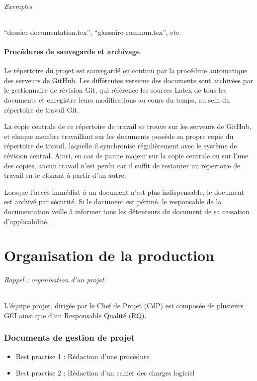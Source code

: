 \documentclass[a4paper]{article}
\begin{document}
\paragraph{Exemples} ``dossier-documentation.tex'', ``glossaire-commun.tex'', etc.

\subsection{Procédures de sauvegarde et archivage}

Le répertoire du projet est sauvegardé en continu par la procédure automatique des serveurs de GitHub. Les différentes versions des documents sont archivées par le gestionnaire de révision Git, qui référence les sources Latex de tous les documents et enregistre leurs modifications au cours du temps, au sein du répertoire de travail Git.

La copie centrale de ce répertoire de travail se trouve sur les serveurs de GitHub, et chaque membre travaillant sur les documents possède sa propre copie du répertoire de travail, laquelle il synchronise régulièrement avec le système de révision central. Ainsi, en cas de panne majeur sur la copie centrale ou sur l'une des copies, aucun travail n'est perdu car il suffit de restaurer un répertoire de travail en le clonant à partir d'un autre.

Lorsque l'accès immédiat à un document n'est plus indispensable, le document est archivé par sécurité. Si le document est périmé, le responsable de la documentation veille à informer tous les détenteurs du document de sa cessation d'applicabilité.

\part{Organisation de la production}

\paragraph{Rappel : organisation d'un projet} L'équipe projet, dirigée par le Chef de Projet (CdP) est composée de plusieurs GEI ainsi que d'un Responsable Qualité (RQ).


\section{Documents de gestion de projet}

\begin{itemize}
\item Best practise 1 : Rédaction d'une procédure
\item Best practise 2 : Rédaction d'un cahier des charges logiciel
\end{itemize}
\end{document}
